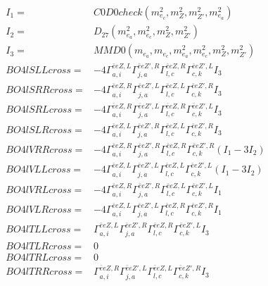 \documentclass[A4,landscape]{article}
\begin{document}
\begin{align} 
I_1 = & C0D0check(m^2_{e_{{c}}}, m^2_{Z}, m^2_{{Z'}}, m^2_{e_{{a}}}) \\ 
I_2 = & D_{27}(m^2_{e_{{a}}}, m^2_{e_{{c}}}, m^2_{Z}, m^2_{{Z'}}) \\ 
I_3 = & MMD0(m_{e_{{a}}}, m_{e_{{c}}}, m^2_{e_{{a}}}, m^2_{e_{{c}}}, m^2_{Z}, m^2_{{Z'}}) \\ 
  BO4lSLLcross= & -4  \Gamma^{\bar{e}e Z ,L}_{a, i} \Gamma^{\bar{e}e {Z'} ,R}_{j, a} \Gamma^{\bar{e}e Z ,R}_{l, c} \Gamma^{\bar{e}e {Z'} ,L}_{c, k} I_3 \\ 
  BO4lSRRcross= & -4  \Gamma^{\bar{e}e Z ,R}_{a, i} \Gamma^{\bar{e}e {Z'} ,L}_{j, a} \Gamma^{\bar{e}e Z ,L}_{l, c} \Gamma^{\bar{e}e {Z'} ,R}_{c, k} I_3 \\ 
  BO4lSRLcross= & -4  \Gamma^{\bar{e}e Z ,R}_{a, i} \Gamma^{\bar{e}e {Z'} ,L}_{j, a} \Gamma^{\bar{e}e Z ,R}_{l, c} \Gamma^{\bar{e}e {Z'} ,L}_{c, k} I_3 \\ 
  BO4lSLRcross= & -4  \Gamma^{\bar{e}e Z ,L}_{a, i} \Gamma^{\bar{e}e {Z'} ,R}_{j, a} \Gamma^{\bar{e}e Z ,L}_{l, c} \Gamma^{\bar{e}e {Z'} ,R}_{c, k} I_3 \\ 
  BO4lVRRcross= & -4  \Gamma^{\bar{e}e Z ,R}_{a, i} \Gamma^{\bar{e}e {Z'} ,R}_{j, a} \Gamma^{\bar{e}e Z ,R}_{l, c} \Gamma^{\bar{e}e {Z'} ,R}_{c, k} (I_1 - 3 I_2) \\ 
  BO4lVLLcross= & -4  \Gamma^{\bar{e}e Z ,L}_{a, i} \Gamma^{\bar{e}e {Z'} ,L}_{j, a} \Gamma^{\bar{e}e Z ,L}_{l, c} \Gamma^{\bar{e}e {Z'} ,L}_{c, k} (I_1 - 3 I_2) \\ 
  BO4lVRLcross= & -4  \Gamma^{\bar{e}e Z ,R}_{a, i} \Gamma^{\bar{e}e {Z'} ,R}_{j, a} \Gamma^{\bar{e}e Z ,L}_{l, c} \Gamma^{\bar{e}e {Z'} ,L}_{c, k} I_1 \\ 
  BO4lVLRcross= & -4  \Gamma^{\bar{e}e Z ,L}_{a, i} \Gamma^{\bar{e}e {Z'} ,L}_{j, a} \Gamma^{\bar{e}e Z ,R}_{l, c} \Gamma^{\bar{e}e {Z'} ,R}_{c, k} I_1 \\ 
  BO4lTLLcross= &  \Gamma^{\bar{e}e Z ,L}_{a, i} \Gamma^{\bar{e}e {Z'} ,R}_{j, a} \Gamma^{\bar{e}e Z ,R}_{l, c} \Gamma^{\bar{e}e {Z'} ,L}_{c, k} I_3 \\ 
  BO4lTLRcross= & 0 \\ 
  BO4lTRLcross= & 0 \\ 
  BO4lTRRcross= &  \Gamma^{\bar{e}e Z ,R}_{a, i} \Gamma^{\bar{e}e {Z'} ,L}_{j, a} \Gamma^{\bar{e}e Z ,L}_{l, c} \Gamma^{\bar{e}e {Z'} ,R}_{c, k} I_3 \\ 
\end{align} 
\end{document}
